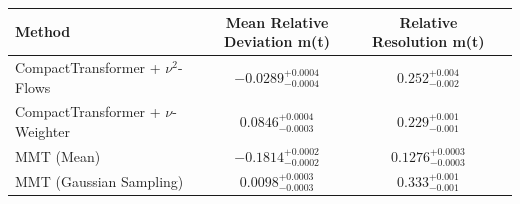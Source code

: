     \begin{tabular}{lccc}
        \toprule
        Method & Mean Relative Deviation m(t) & Relative Resolution m(t) \\
        \midrule
        CompactTransformer + $\nu^2$-Flows & $-0.0289_{-0.0004}^{+0.0004}$ & $0.252_{-0.002}^{+0.004}$ \\
        CompactTransformer + $\nu$-Weighter & $0.0846_{-0.0003}^{+0.0004}$ & $0.229_{-0.001}^{+0.001}$ \\
        MMT (Mean) & $-0.1814_{-0.0002}^{+0.0002}$ & $0.1276_{-0.0003}^{+0.0003}$ \\
        MMT (Gaussian Sampling) & $0.0098_{-0.0003}^{+0.0003}$ & $0.333_{-0.001}^{+0.001}$ \\
        \bottomrule
    \end{tabular}